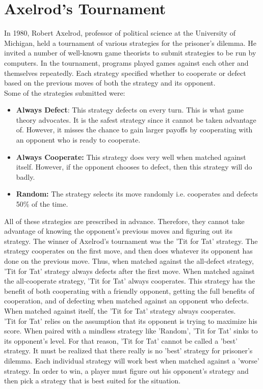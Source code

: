 \documentclass[a4paper]{article}
\begin{document}
	\section{Axelrod's Tournament}

	In 1980, Robert Axelrod, professor of political science at the University of Michigan, held a tournament of various strategies for the prisoner's dilemma. He invited a number of well-known game theorists to submit strategies to be run by computers. In the tournament, programs played games against each other and themselves repeatedly. Each strategy specified whether to cooperate or defect based on the previous moves of both the strategy and its opponent.\\
	Some of the strategies submitted were:
	\begin{itemize}
	\item \textbf{Always Defect}: This strategy defects on every turn. This is what game theory advocates. It is the safest strategy since it cannot be taken advantage of. However, it misses the chance to gain larger payoffs by cooperating with an opponent who is ready to cooperate.
	\item \textbf{Always Cooperate:} This strategy does very well when matched against itself. However, if the opponent chooses to defect, then this strategy will do badly.
	\item \textbf{Random:} The strategy selects its move randomly i.e. cooperates and defects 50\% of the time.
	\end{itemize}
	
	All of these strategies are prescribed in advance. Therefore, they cannot take advantage of knowing the opponent's previous moves and figuring out its strategy. The winner of Axelrod's tournament was the 'Tit for Tat' strategy. The strategy cooperates on the first move, and then does whatever its opponent has done on the previous move. Thus, when matched against the all-defect strategy, 'Tit for Tat' strategy always defects after the first move. When matched against the all-cooperate strategy, 'Tit for Tat' always cooperates. This strategy has the benefit of both cooperating with a friendly opponent, getting the full benefits of cooperation, and of defecting when matched against an opponent who defects. When matched against itself, the 'Tit for Tat' strategy always cooperates.\\
	'Tit for Tat' relies on the assumption that its opponent is trying to maximize his score. When paired with a mindless strategy like 'Random', 'Tit for Tat' sinks to its opponent's level. For that reason, 'Tit for Tat' cannot be called a 'best' strategy. It must be realized that there really is no 'best' strategy for prisoner's dilemma. Each individual strategy will work best when matched against a 'worse' strategy. In order to win, a player must figure out his opponent's strategy and then pick a strategy that is best suited for the situation.
	
\end{document}
